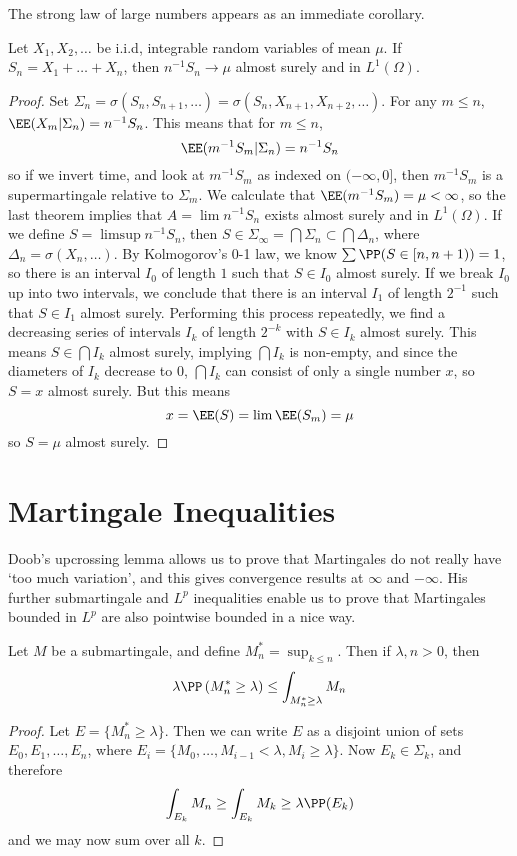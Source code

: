 The strong law of large numbers appears as an immediate corollary.

\begin{corollary}
    Let $X_1, X_2, \dots$ be i.i.d, integrable random variables of mean $\mu$. If $S_n = X_1 + \dots + X_n$, then $n^{-1}S_n \to \mu$ almost surely and in $L^1(\Omega)$.
\end{corollary}
\begin{proof}
    Set $\Sigma_n = \sigma(S_n,S_{n+1}, \dots) = \sigma(S_n, X_{n+1}, X_{n+2}, \dots)$. For any $m \leq n$, $\EE(X_m|\Sigma_n) = n^{-1}S_n$. This means that for $m \leq n$,
    \[ \EE(m^{-1}S_m|\Sigma_n) = n^{-1}S_n \]
    so if we invert time, and look at $m^{-1}S_m$ as indexed on $(-\infty,0]$, then $m^{-1}S_m$ is a supermartingale relative to $\Sigma_m$. We calculate that $\EE(m^{-1}S_m) = \mu < \infty$, so the last theorem implies that $A = \lim n^{-1}S_n$ exists almost surely and in $L^1(\Omega)$. If we define $S = \limsup n^{-1}S_n$, then $S \in \Sigma_\infty = \bigcap \Sigma_n \subset \bigcap \Delta_n$, where $\Delta_n = \sigma(X_n, \dots)$. By Kolmogorov's 0-1 law, we know $\sum \PP(S \in [n,n+1)) = 1$, so there is an interval $I_0$ of length $1$ such that $S \in I_0$ almost surely. If we break $I_0$ up into two intervals, we conclude that there is an interval $I_1$ of length $2^{-1}$ such that $S \in I_1$ almost surely. Performing this process repeatedly, we find a decreasing series of intervals $I_k$ of length $2^{-k}$ with $S \in I_k$ almost surely. This means $S \in \bigcap I_k$ almost surely, implying $\bigcap I_k$ is non-empty, and since the diameters of $I_k$ decrease to $0$, $\bigcap I_k$ can consist of only a single number $x$, so $S = x$ almost surely. But this means
    \[ x = \EE(S) = \lim \EE(S_m) = \mu \]
    so $S = \mu$ almost surely.
\end{proof}

\section{Martingale Inequalities}

Doob's upcrossing lemma allows us to prove that Martingales do not really have `too much variation', and this gives convergence results at $\infty$ and $-\infty$. His further submartingale and $L^p$ inequalities enable us to prove that Martingales bounded in $L^p$ are also pointwise bounded in a nice way.

\begin{theorem}
    Let $M$ be a submartingale, and define $M^*_n = \sup_{k \leq n}$. Then if $\lambda, n > 0$, then
    \[ \lambda \PP \left( M^*_n \geq \lambda \right) \leq \int_{M^*_n \geq \lambda} M_n \]
\end{theorem}
\begin{proof}
    Let $E = \{ M^*_n \geq \lambda \}$. Then we can write $E$ as a disjoint union of sets $E_0,E_1,\dots, E_n$, where $E_i = \{ M_0, \dots, M_{i-1} < \lambda, M_i \geq \lambda \}$. Now $E_k \in \Sigma_k$, and therefore
    \[ \int_{E_k} M_n \geq \int_{E_k} M_k \geq \lambda \PP(E_k) \]
    and we may now sum over all $k$.
\end{proof}

